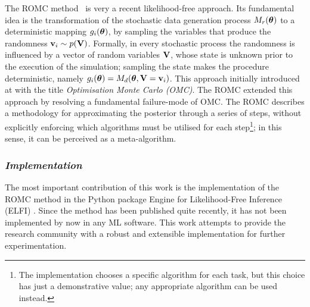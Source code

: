 The ROMC method~\autocite{Ikonomov2019} is very a recent
likelihood-free approach. Its fundamental idea is the transformation
of the stochastic data generation process $M_r(\boldsymbol{\theta})$ to a
deterministic mapping $g_i(\boldsymbol{\theta})$, by sampling the variables that
produce the randomness $\mathbf{v}_i \sim p(\mathbf{V})$. Formally, in every
stochastic process the randomness is influenced by a vector of random
variables $\mathbf{V}$, whose state is unknown prior to the execution of the
simulation; sampling the state makes the procedure deterministic,
namely $g_i(\boldsymbol{\theta}) = M_d(\boldsymbol{\theta}, \mathbf{V}=\mathbf{v}_i)$. This approach
initially introduced at \autocite{Meeds2015} with the title
\textit{Optimisation Monte Carlo (OMC)}. The ROMC extended this
approach by resolving a fundamental failure-mode of OMC\@. The ROMC
describes a methodology for approximating the posterior through a
series of steps, without explicitly enforcing which algorithms must be
utilised for each step\footnote{The implementation chooses a specific
  algorithm for each task, but this choice has just a demonstrative
  value; any appropriate algorithm can be used instead.}; in this
sense, it can be perceived as a meta-algorithm.

\subsubsection*{\textit{Implementation}}

The most important contribution of this work is the implementation of
the ROMC method in the Python package Engine for Likelihood-Free
Inference (ELFI) \autocite{1708.00707}. Since the method has been
published quite recently, it has not been implemented by now in any ML
software. This work attempts to provide the research community with a
robust and extensible implementation for further experimentation.
